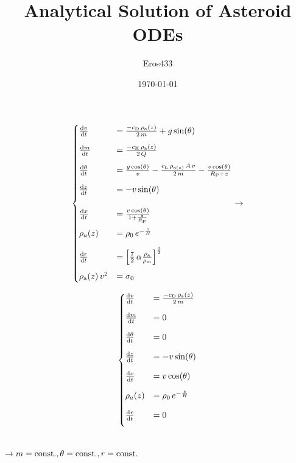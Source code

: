 \documentclass{article}
\title{Analytical Solution of Asteroid ODEs}
\author{Eros433}
\date{\today}
\begin{document}
\maketitle

\noindent\begin{minipage}{.5\linewidth}
\begin{align*}
\begin{cases}
\frac{{\rm d}v}{{\rm d}t}&=\frac{-c_{{\rm D}}\,\rho_{\rm a}(z)}{2\,m}+g\,{\rm sin}(\theta)\\[0.3cm]
\frac{{\rm d}m}{{\rm d}t}&=\frac{-c_{{\rm H}}\,\rho_{\rm a}(z)}{2\,Q}\\[0.3cm]
\frac{{\rm d}\theta}{{\rm d}t}&=\frac{g\,{\rm cos}(\theta)}{v}-\frac{c_{\rm L}\,\rho_{{\rm a}(z)}\,A\,v}{2\,m}-\frac{v\,{\rm cos}(\theta)}{R_{\rm P}+z}\\[0.3cm]
\frac{{\rm d}z}{{\rm d}t}&=-v\,{\rm sin}(\theta)\\[0.5cm]
\frac{{\rm d}x}{{\rm d}t}&=\frac{v\,{\rm cos}(\theta)}{1+\frac{z}{R_{\rm P}}}\\[0.3cm]
\rho_a(z)&=\rho_0\,e^{-\frac{z}{H}}\\[0.3cm]
\frac{{\rm d}r}{{\rm d}t}&=\left[\frac{7}{2}\,\alpha\frac{\rho_{\rm a}}{\rho_{{\rm m}}}\right]^{\frac{1}{2}}\\[0.3cm]
\rho_{\rm a}(z)\,v^{\rm 2}&=\sigma_{\rm 0}
\end{cases}
\rightarrow
\end{align*}
\end{minipage}%
\begin{minipage}{.5\linewidth}
\begin{align*}
\begin{cases}
\frac{{\rm d}v}{{\rm d}t}&=\frac{-c_{{\rm D}}\,\rho_{\rm a}(z)}{2\,m}\\[0.3cm]
\frac{{\rm d}m}{{\rm d}t}&=0\\[0.3cm]
\frac{{\rm d}\theta}{{\rm d}t}&=0\\[0.3cm]
\frac{{\rm d}z}{{\rm d}t}&=-v\,{\rm sin}(\theta)\\[0.3cm]
\frac{{\rm d}x}{{\rm d}t}&=v\,{\rm cos}(\theta)\\[0.3cm]
\rho_a(z)&=\rho_0\,e^{-\frac{z}{H}}\\[0.3cm]
\frac{{\rm d}r}{{\rm d}t}&=0\\[0.3cm]
\end{cases}
\end{align*}
\end{minipage}
\\[0.5cm]
$\rightarrow m={\rm const.},\theta={\rm const.},r={\rm const.}$\\[0.3cm]
\end{document}
